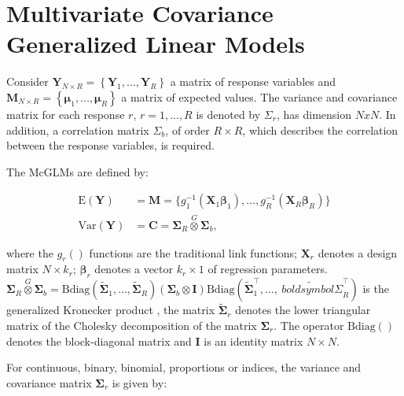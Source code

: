 \documentclass[AMA,STIX1COL]{WileyNJD-v2}
\begin{document}

\section{Multivariate Covariance Generalized Linear Models}\label{sec3}

Consider $\boldsymbol{Y}_{N \times R} = \left \{ \boldsymbol{Y}_1, \dots, \boldsymbol{Y}_R \right \}$ a matrix of response variables and $\boldsymbol{ M}_{N \times R} = \left \{ \boldsymbol{\mu}_1, \dots, \boldsymbol{\mu}_R \right \}$ a matrix of expected values. The variance and covariance matrix for each response $r$, $r = 1,..., R$ is denoted by $\Sigma_r$, has dimension $NxN$. In addition, a correlation matrix $\Sigma_b$, of order $R \times R$, which describes the correlation between the response variables, is required.

The McGLMs \citep{Bonat16}are defined by:

$$
      \begin{aligned}
        \mathrm{E}(\boldsymbol{Y}) &=
          \boldsymbol{M} =
            \{g_1^{-1}(\boldsymbol{X}_1 \boldsymbol{\beta}_1),
            \ldots,
            g_R^{-1}(\boldsymbol{X}_R \boldsymbol{\beta}_R)\}
          \\
        \mathrm{Var}(\boldsymbol{Y}) &=
          \boldsymbol{C} =
            \boldsymbol{\Sigma}_R \overset{G} \otimes
            \boldsymbol{\Sigma}_b,
      \end{aligned}
$$

\noindent where the $g_r()$ functions are the traditional link functions; $\boldsymbol{X}_r$ denotes a design matrix $N \times k_r$; $\boldsymbol{\beta}_r$ denotes a vector $k_r \times 1$ of regression parameters. $\boldsymbol{\Sigma}_R \overset{G} \otimes \boldsymbol{\Sigma}_b = \mathrm{Bdiag}(\tilde{\boldsymbol{\Sigma}}_1, \ldots, \tilde{\boldsymbol{ \Sigma}}_R) (\boldsymbol{\Sigma}_b \otimes \boldsymbol{I}) \mathrm{Bdiag}(\tilde{\boldsymbol{\Sigma}}_1^\top, \ldots, \tilde{\ boldsymbol{\Sigma}}_R^\top)$ is the generalized Kronecker product  \cite{martinez13}, the matrix $\tilde{\boldsymbol{\Sigma}}_r$ denotes the lower triangular matrix of the Cholesky decomposition of the matrix ${\boldsymbol{\Sigma}}_r$. The operator $\mathrm{Bdiag()}$ denotes the block-diagonal matrix and $\boldsymbol{I}$ is an identity matrix $N \times N$.

For continuous, binary, binomial, proportions or indices, the variance and covariance matrix $\boldsymbol{\Sigma}_r$ is given by:
\end{document}
